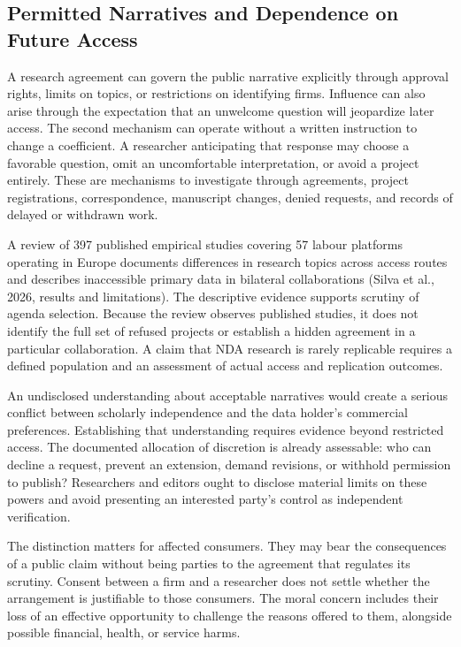 \hypertarget{M09-permitted-narratives-and-dependence-on-future-access}{%
\subsection{Permitted Narratives and Dependence on Future
Access}\label{M09-permitted-narratives-and-dependence-on-future-access}}

\noindent \noindent A research agreement can govern the public narrative
explicitly through approval rights, limits on topics, or restrictions on
identifying firms. Influence can also arise through the expectation that
an unwelcome question will jeopardize later access. The second mechanism
can operate without a written instruction to change a coefficient. A
researcher anticipating that response may choose a favorable question,
omit an uncomfortable interpretation, or avoid a project entirely. These
are mechanisms to investigate through agreements, project registrations,
correspondence, manuscript changes, denied requests, and records of
delayed or withdrawn work.

A review of 397 published empirical studies covering 57 labour platforms
operating in Europe documents differences in research topics across
access routes and describes inaccessible primary data in bilateral
collaborations (Silva et al., 2026, results and limitations). The
descriptive evidence supports scrutiny of agenda selection. Because the
review observes published studies, it does not identify the full set of
refused projects or establish a hidden agreement in a particular
collaboration. A claim that NDA research is rarely replicable requires a
defined population and an assessment of actual access and replication
outcomes.

An undisclosed understanding about acceptable narratives would create a
serious conflict between scholarly independence and the data holder's
commercial preferences. Establishing that understanding requires
evidence beyond restricted access. The documented allocation of
discretion is already assessable: who can decline a request, prevent an
extension, demand revisions, or withhold permission to publish?
Researchers and editors ought to disclose material limits on these
powers and avoid presenting an interested party's control as independent
verification.

The distinction matters for affected consumers. They may bear the
consequences of a public claim without being parties to the agreement
that regulates its scrutiny. Consent between a firm and a researcher
does not settle whether the arrangement is justifiable to those
consumers. The moral concern includes their loss of an effective
opportunity to challenge the reasons offered to them, alongside possible
financial, health, or service harms.

